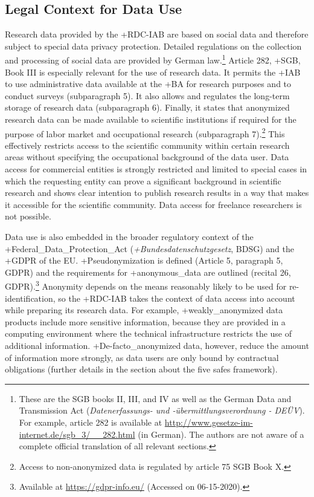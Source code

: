 \documentclass[
]{book}
\begin{document}
\hypertarget{legal-context-for-data-use}{%
\subsection{Legal Context for Data Use}\label{legal-context-for-data-use}}

Research data provided by the +RDC-IAB\textbar{} are based on social data and therefore subject to special data privacy protection. Detailed regulations on the collection and processing of social data are provided by German law.\footnote{These are the SGB books II, III, and IV as well as the German Data and Transmission Act (\emph{Datenerfassungs- und -übermittlungsverordnung - DEÜV}). For example, article 282 is available at \url{http://www.gesetze-im-internet.de/sgb_3/__282.html} (in German). The authors are not aware of a complete official translation of all relevant sections.} Article 282, +SGB\textbar, Book III is especially relevant for the use of research data. It permits the +IAB\textbar{} to use administrative data available at the +BA\textbar{} for research purposes and to conduct surveys (subparagraph 5). It also allows and regulates the long-term storage of research data (subparagraph 6). Finally, it states that anonymized research data can be made available to scientific institutions if required for the purpose of labor market and occupational research (subparagraph 7).\footnote{Access to non-anonymized data is regulated by article 75 SGB Book X.} This effectively restricts access to the scientific community within certain research areas without specifying the occupational background of the data user. Data access for commercial entities is strongly restricted and limited to special cases in which the requesting entity can prove a significant background in scientific research and shows clear intention to publish research results in a way that makes it accessible for the scientific community. Data access for freelance researchers is not possible.

Data use is also embedded in the broader regulatory context of the +Federal\_Data\_Protection\_Act\textbar{} (\emph{+Bundesdatenschutzgesetz\textbar{}}, BDSG) and the +GDPR\textbar{} of the EU. +Pseudonymization\textbar{} is defined (Article 5, paragraph 5, GDPR) and the requirements for +anonymous\_data\textbar{} are outlined (recital 26, GDPR).\footnote{Available at \url{https://gdpr-info.eu/} (Accessed on 06-15-2020).} Anonymity depends on the means reasonably likely to be used for re-identification, so the +RDC-IAB\textbar{} takes the context of data access into account while preparing its research data. For example, +weakly\_anonymized\textbar{} data products include more sensitive information, because they are provided in a computing environment where the technical infrastructure restricts the use of additional information. +De-facto\_anonymized\textbar{} data, however, reduce the amount of information more strongly, as data users are only bound by contractual obligations (further details in the section about the five safes framework).
\end{document}
